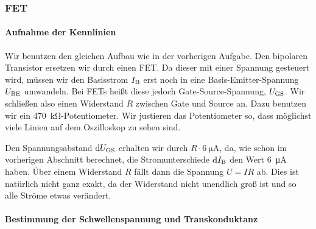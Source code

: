 \subsubsection{FET}

\paragraph{Aufnahme der Kennlinien}

Wir benutzen den gleichen Aufbau wie in der vorherigen Aufgabe. Den bipolaren
Transistor ersetzen wir durch einen FET. Da dieser mit einer Spannung gesteuert
wird, müssen wir den Basisstrom $I_\text{B}$ erst noch in eine Basis-Emitter-Spannung
$U_\text{BE}$ umwandeln. Bei FETs heißt diese jedoch Gate-Source-Spannung, $U_\text{GS}$. Wir
schließen also einen Widerstand $R$ zwischen Gate und Source an. Dazu benutzen
wir ein \SI{470}{\kilo\ohm}-Potentiometer. Wir justieren das Potentiometer so,
dass möglichst viele Linien auf dem Oszilloskop zu sehen sind.

Den Spannungsabstand $\dif\UGS$ erhalten wir durch $R \cdot
\SI{6}{\micro\ampere}$, da, wie schon im vorherigen Abschnitt berechnet, die
Stromunterschiede $\dif\IB$ den Wert \SI{6}{\micro\ampere} haben. Über einem
Widerstand $R$ fällt dann die Spannung $U = IR$ ab. Dies ist natürlich nicht
ganz exakt, da der Widerstand nicht unendlich groß ist und so alle Ströme etwas
verändert.

\paragraph{Bestimmung der Schwellenspannung und Transkonduktanz}
\label{par:Schwellenspannung}


